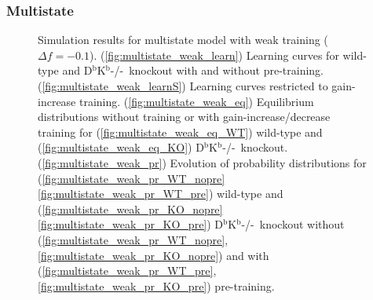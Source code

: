 \documentclass[12pt]{article}
\newcommand{\KO}{D$^\mathrm{b}$K$^\mathrm{b}$-/-}
\begin{document}
\subsubsection{Multistate}\label{sec:multistate}

\begin{figure}
 \begin{center}
 \begin{myenuma}
  \item{}\label{fig:multistate_weak_learn}
  \item{}\label{fig:multistate_weak_learnS}
  \item\label{fig:multistate_weak_eq}\begin{myenumi}
                    \item{}\label{fig:multistate_weak_eq_WT}
                    \item{}\label{fig:multistate_weak_eq_KO}
                  \end{myenumi}
  \item\label{fig:multistate_weak_pr}\begin{myenumi}
                    \item{}\label{fig:multistate_weak_pr_WT_nopre}
                    \item{}\label{fig:multistate_weak_pr_WT_pre}
                    \item{}\label{fig:multistate_weak_pr_KO_nopre}
                    \item{}\label{fig:multistate_weak_pr_KO_pre}
                  \end{myenumi}
 \end{myenuma}
 \end{center}
  \caption{Simulation results for multistate model with weak training ($\Delta f=-0.1$).
  (\ref{fig:multistate_weak_learn}) Learning curves for wild-type and \KO\ knockout with and without pre-training.
  (\ref{fig:multistate_weak_learnS}) Learning curves restricted to gain-increase training.
  (\ref{fig:multistate_weak_eq}) Equilibrium distributions without training or with gain-increase/decrease training for (\ref{fig:multistate_weak_eq_WT}) wild-type and (\ref{fig:multistate_weak_eq_KO}) \KO\ knockout.
  (\ref{fig:multistate_weak_pr}) Evolution of probability distributions for (\ref{fig:multistate_weak_pr_WT_nopre}\ref{fig:multistate_weak_pr_WT_pre}) wild-type and  (\ref{fig:multistate_weak_pr_KO_nopre}\ref{fig:multistate_weak_pr_KO_pre}) \KO\ knockout without (\ref{fig:multistate_weak_pr_WT_nopre},\ref{fig:multistate_weak_pr_KO_nopre}) and with (\ref{fig:multistate_weak_pr_WT_pre},\ref{fig:multistate_weak_pr_KO_pre}) pre-training. } \label{fig:multistate_weak}
\end{figure}
\end{document}
